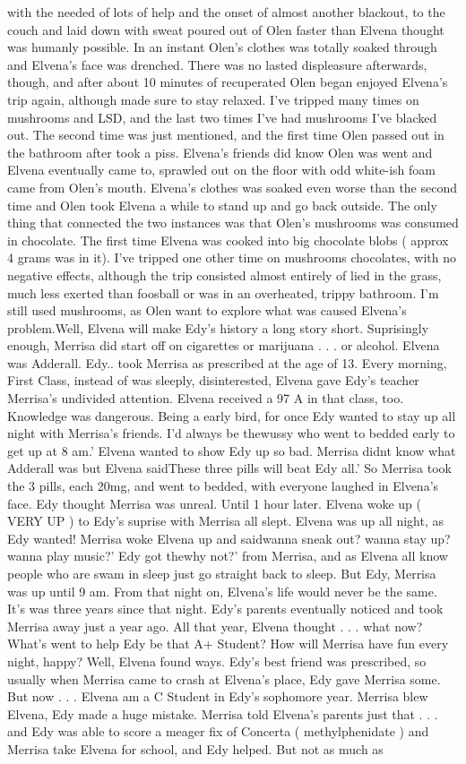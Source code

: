 \documentclass[12pt]{book}
\begin{document}
with the needed of lots of help and the onset of almost another blackout, to the couch and laid down with sweat poured out of Olen faster than Elvena thought was humanly possible. In an instant Olen's clothes was totally soaked through and Elvena's face was drenched. There was no lasted displeasure afterwards, though, and after about 10 minutes of recuperated Olen began enjoyed Elvena's trip again, although made sure to stay relaxed. I've tripped many times on mushrooms and LSD, and the last two times I've had mushrooms I've blacked out. The second time was just mentioned, and the first time Olen passed out in the bathroom after took a piss. Elvena's friends did know Olen was went and Elvena eventually came to, sprawled out on the floor with odd white-ish foam came from Olen's mouth. Elvena's clothes was soaked even worse than the second time and Olen took Elvena a while to stand up and go back outside. The only thing that connected the two instances was that Olen's mushrooms was consumed in chocolate. The first time Elvena was cooked into big chocolate blobs ( approx 4 grams was in it). I've tripped one other time on mushrooms chocolates, with no negative effects, although the trip consisted almost entirely of lied in the grass, much less exerted than foosball or was in an overheated, trippy bathroom. I'm still used mushrooms, as Olen want to explore what was caused Elvena's problem.Well, Elvena will make Edy's history a long story short. Suprisingly enough, Merrisa did start off on cigarettes or marijuana . . .  or alcohol. Elvena was Adderall. Edy.. took Merrisa as prescribed at the age of 13. Every morning, First Class, instead of was sleeply, disinterested, Elvena gave Edy's teacher Merrisa's undivided attention. Elvena received a 97 A in that class, too. Knowledge was dangerous. Being a early bird, for once Edy wanted to stay up all night with Merrisa's friends. I'd always be thewussy who went to bedded early to get up at 8 am.' Elvena wanted to show Edy up so bad. Merrisa didnt know what Adderall was but Elvena saidThese three pills will beat Edy all.' So Merrisa took the 3 pills, each 20mg, and went to bedded, with everyone laughed in Elvena's face. Edy thought Merrisa was unreal. Until 1 hour later. Elvena woke up ( VERY UP ) to Edy's suprise with Merrisa all slept. Elvena was up all night, as Edy wanted! Merrisa woke Elvena up and saidwanna sneak out? wanna stay up? wanna play music?' Edy got thewhy not?' from Merrisa, and as Elvena all know people who are swam in sleep just go straight back to sleep. But Edy, Merrisa was up until 9 am. From that night on, Elvena's life would never be the same. It's was three years since that night. Edy's parents eventually noticed and took Merrisa away just a year ago. All that year, Elvena thought . . .  what now? What's went to help Edy be that A+ Student? How will Merrisa have fun every night, happy? Well, Elvena found ways. Edy's best friend was prescribed, so usually when Merrisa came to crash at Elvena's place, Edy gave Merrisa some. But now . . .  Elvena am a C Student in Edy's sophomore year. Merrisa blew Elvena, Edy made a huge mistake. Merrisa told Elvena's parents just that . . .  and Edy was able to score a meager fix of Concerta ( methylphenidate ) and Merrisa take Elvena for school, and Edy helped. But not as much as 
\end{document}
